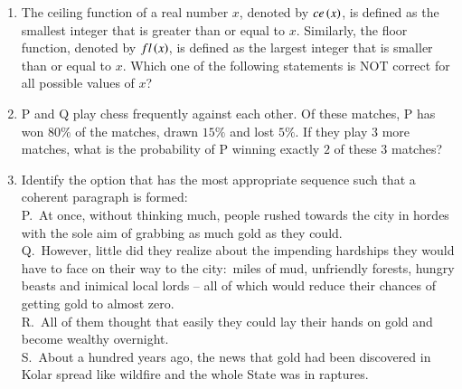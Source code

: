 \documentclass[journal]{IEEEtran}
\begin{document}
\begin{enumerate}[leftmargin=0pt]
\item
The ceiling function of a real number $x$, denoted by $ce\left(x\right)$, is defined as the smallest integer that is greater than or equal to $x$. Similarly, the floor function, denoted by $fl\left(x\right)$, is defined as the largest integer that is smaller than or equal to $x$. Which one of the following statements is NOT correct for all possible values of $x$?

\vspace{0.2cm}
\begin{enumerate}
\end{enumerate}
\hfill{}

\item
P and Q play chess frequently against each other. Of these matches, P has won $80\%$ of the matches, drawn $15\%$ and lost $5\%$. If they play $3$ more matches, what is the probability of P winning exactly $2$ of these $3$ matches?

\vspace{0.2cm}
\begin{enumerate}
\end{enumerate}
\hfill{}

\item
Identify the option that has the most appropriate sequence such that a coherent paragraph is formed$\colon$\\
P.\ At once, without thinking much, people rushed towards the city in hordes with the sole aim of grabbing as much gold as they could.\\
Q.\ However, little did they realize about the impending hardships they would have to face on their way to the city$\colon$ miles of mud, unfriendly forests, hungry beasts and inimical local lords -- all of which would reduce their chances of getting gold to almost zero.\\
R.\ All of them thought that easily they could lay their hands on gold and become wealthy overnight.\\
S.\ About a hundred years ago, the news that gold had been discovered in Kolar spread like wildfire and the whole State was in raptures.


\end{enumerate}
\end{document}
